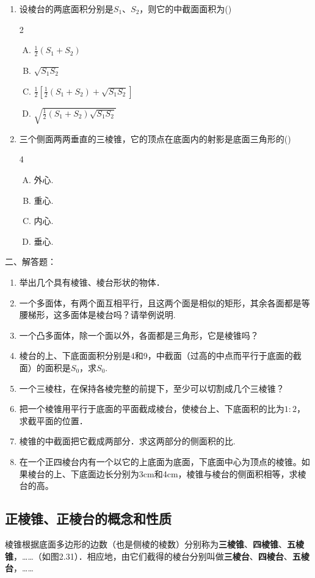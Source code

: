 \begin{enumerate}
\item 设棱台的两底面积分别是$S_1$、$S_2$，则它的中截面面积为\hfill (\qquad )
\begin{multicols}{2}
    \begin{enumerate}[(A)]
        \item $\frac{1}{2}(S_1+S_2)$
        \item $\sqrt{S_1S_2}$
        \item $\frac{1}{2}\left[\frac{1}{2}(S_1+S_2)+\sqrt{S_1S_2}\right]$
        \item $\sqrt{\frac{1}{2}(S_1+S_2)\sqrt{S_1S_2}}$
    \end{enumerate}
    \end{multicols}
\item 三个侧面两两垂直的三棱锥，它的顶点在底面内的射影是底面三角形的\hfill (\qquad )
\begin{multicols}{4}
\begin{enumerate}[(A)]
\item 外心.
\item 重心.
\item 内心.
\item 垂心.
\end{enumerate}
\end{multicols}
\end{enumerate}

二、解答题：
\begin{enumerate}
\item 举出几个具有棱锥、棱台形状的物体．
\item 一个多面体，有两个面互相平行，且这两个面是相似的矩形，其余各面都是等腰梯形，这多面体是棱台吗？请举例说明.
\item 一个凸多面体，除一个面以外，各面都是三角形，它是棱锥吗？
\item 棱台的上、下底面面积分别是4和9，中截面（过高的中点而平行于底面的截面）的面积是$S_0$，求$S_0$.
\item 一个三棱柱，在保持各棱完整的前提下，至少可以切割成几个三棱锥？
\item 把一个棱锥用平行于底面的平面截成棱台，使棱台上、下底面积的比为$1:2$，求截平面的位置．
\item 棱锥的中截面把它截成两部分．求这两部分的侧面积的比.
\item 在一个正四棱台内有一个以它的上底面为底面，下底面中心为顶点的棱锥。如果棱台的上、下底面边长分别为3cm和4cm，棱锥与棱台的侧面积相等，求棱台的高。
\end{enumerate}


\subsection{正棱锥、正棱台的概念和性质}
棱锥根据底面多边形的边数（也是侧棱的棱数）分别称为\textbf{三棱锥}、\textbf{四棱锥}、\textbf{五棱锥}，……（如图2.31）．相应地，由它们截得的棱台分别叫做\textbf{三棱台}、\textbf{四棱台}、\textbf{五棱台}，……

